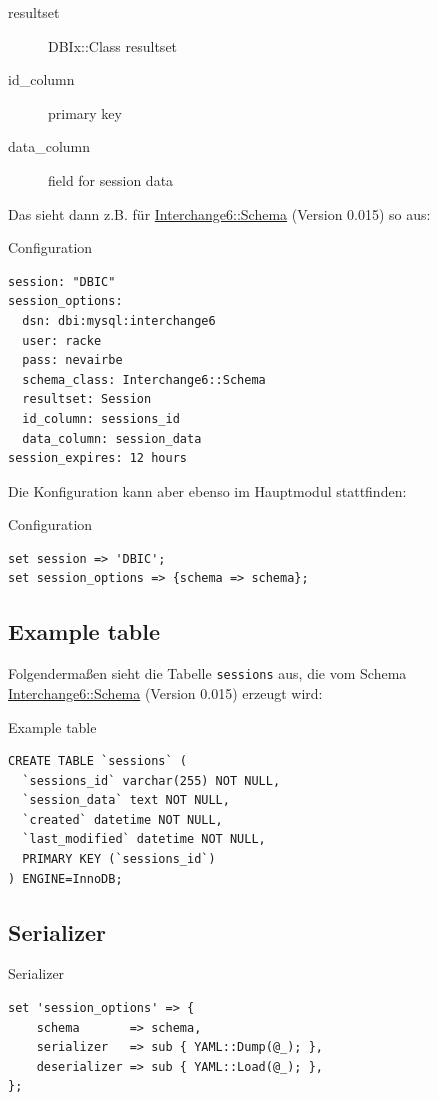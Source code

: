 \begin{description}
\item[resultset] DBIx::Class resultset
\item[id\_column] primary key
\item[data\_column] field for session data 
\end{description}

Das sieht dann z.B. für \href{https://metacpan.org/pod/Interchange6::Schema}{Interchange6::Schema} (Version 0.015) so aus:

\begin{frame}[fragile]{Configuration}
\begin{lstlisting}
session: "DBIC"
session_options:
  dsn: dbi:mysql:interchange6
  user: racke
  pass: nevairbe
  schema_class: Interchange6::Schema
  resultset: Session
  id_column: sessions_id
  data_column: session_data
session_expires: 12 hours
\end{lstlisting}
\end{frame}

Die Konfiguration kann aber ebenso im Hauptmodul
stattfinden:

\begin{frame}[fragile]{Configuration}
\begin{lstlisting}
set session => 'DBIC';
set session_options => {schema => schema};
\end{lstlisting}
\end{frame}

\subsection{Example table}

Folgendermaßen sieht die Tabelle \verb|sessions| aus,
die vom Schema \href{https://metacpan.org/pod/Interchange6::Schema}{Interchange6::Schema} (Version 0.015)
erzeugt wird:

\begin{frame}[fragile]{Example table}
\begin{lstlisting}
CREATE TABLE `sessions` (
  `sessions_id` varchar(255) NOT NULL,
  `session_data` text NOT NULL,
  `created` datetime NOT NULL,
  `last_modified` datetime NOT NULL,
  PRIMARY KEY (`sessions_id`)
) ENGINE=InnoDB;
\end{lstlisting}
\end{frame}

\subsection{Serializer}
\begin{frame}[fragile]{Serializer}
\begin{lstlisting}
set 'session_options' => {
    schema       => schema,
    serializer   => sub { YAML::Dump(@_); },
    deserializer => sub { YAML::Load(@_); },
};
\end{lstlisting}
\end{frame}


